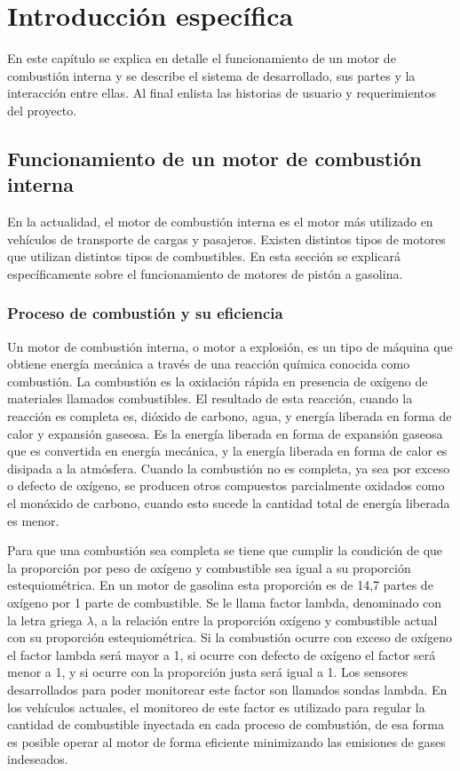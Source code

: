 \chapter{Introducción específica} %

\label{Chapter2}

En este capítulo se explica en detalle el funcionamiento de un motor de combustión interna y se describe el sistema de desarrollado, sus partes y la interacción entre ellas. Al final enlista las historias de usuario y requerimientos del proyecto.

\section{Funcionamiento de un motor de combustión interna} \label{func-motor}

En la actualidad, el motor de combustión interna es el motor más utilizado en vehículos de transporte de cargas y pasajeros. Existen distintos tipos de motores que utilizan distintos tipos de combustibles. En esta sección se explicará específicamente sobre el funcionamiento de motores de pistón a gasolina.

\subsection{Proceso de combustión y su eficiencia}

Un motor de combustión interna, o motor a explosión, es un tipo de máquina que obtiene energía mecánica a través de una reacción química conocida como combustión. La combustión es la oxidación rápida en presencia de oxígeno de materiales llamados combustibles. El resultado de esta reacción, cuando la reacción es completa es, dióxido de carbono, agua, y energía liberada en forma de calor y expansión gaseosa. Es la energía liberada en forma de expansión gaseosa que es convertida en energía mecánica, y la energía liberada en forma de calor es disipada a la atmósfera. Cuando la combustión no es completa, ya sea por exceso o defecto de oxígeno, se producen otros compuestos parcialmente oxidados como el monóxido de carbono, cuando esto sucede la cantidad total de energía liberada es menor.

Para que una combustión sea completa se tiene que cumplir la condición de que la proporción por peso de oxígeno y combustible sea igual a su proporción estequiométrica. En un motor de gasolina esta proporción es de 14,7 partes de oxígeno por 1 parte de combustible\citep{book-afr}. Se le llama factor lambda, denominado con la letra griega $\lambda$, a la relación entre la proporción oxígeno y combustible actual con su proporción estequiométrica. Si la combustión ocurre con exceso de oxígeno el factor lambda será mayor a 1, si ocurre con defecto de oxígeno el factor será menor a 1, y si ocurre con la proporción justa será igual a 1. Los sensores desarrollados para poder monitorear este factor son llamados sondas lambda. En los vehículos actuales, el monitoreo de este factor es utilizado para regular la cantidad de combustible inyectada en cada proceso de combustión, de esa forma es posible operar al motor de forma eficiente minimizando las emisiones de gases indeseados.

